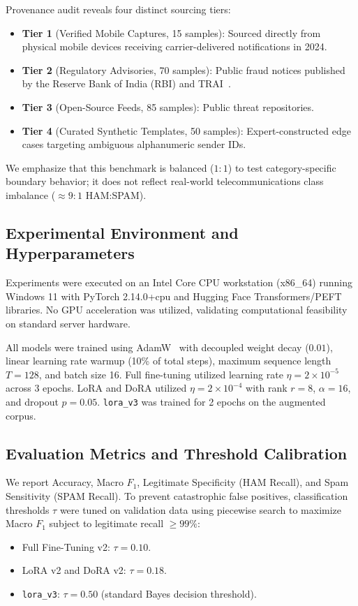 \documentclass[conference]{IEEEtran}
\begin{document}
Provenance audit reveals four distinct sourcing tiers:
\begin{itemize}
    \item \textbf{Tier 1} (Verified Mobile Captures, 15 samples): Sourced directly from physical mobile devices receiving carrier-delivered notifications in 2024.
    \item \textbf{Tier 2} (Regulatory Advisories, 70 samples): Public fraud notices published by the Reserve Bank of India (RBI) and TRAI~\cite{trai2018tcccpr}.
    \item \textbf{Tier 3} (Open-Source Feeds, 85 samples): Public threat repositories.
    \item \textbf{Tier 4} (Curated Synthetic Templates, 50 samples): Expert-constructed edge cases targeting ambiguous alphanumeric sender IDs.
\end{itemize}
We emphasize that this benchmark is balanced ($1:1$) to test category-specific boundary behavior; it does not reflect real-world telecommunications class imbalance ($\approx 9:1$ HAM:SPAM).

\subsection{Experimental Environment and Hyperparameters}
Experiments were executed on an Intel Core CPU workstation (x86\_64) running Windows 11 with PyTorch 2.14.0+cpu and Hugging Face Transformers/PEFT libraries. No GPU acceleration was utilized, validating computational feasibility on standard server hardware.

All models were trained using AdamW~\cite{loshchilov2019adamw} with decoupled weight decay ($0.01$), linear learning rate warmup (10\% of total steps), maximum sequence length $T=128$, and batch size 16. Full fine-tuning utilized learning rate $\eta = 2 \times 10^{-5}$ across 3 epochs. LoRA and DoRA utilized $\eta = 2 \times 10^{-4}$ with rank $r=8$, $\alpha=16$, and dropout $p=0.05$. \texttt{lora\_v3} was trained for 2 epochs on the augmented corpus.

\subsection{Evaluation Metrics and Threshold Calibration}
We report Accuracy, Macro $F_1$, Legitimate Specificity (HAM Recall), and Spam Sensitivity (SPAM Recall). To prevent catastrophic false positives, classification thresholds $\tau$ were tuned on validation data using piecewise search to maximize Macro $F_1$ subject to legitimate recall $\ge 99\%$:
\begin{itemize}
    \item Full Fine-Tuning v2: $\tau = 0.10$.
    \item LoRA v2 and DoRA v2: $\tau = 0.18$.
    \item \texttt{lora\_v3}: $\tau = 0.50$ (standard Bayes decision threshold).
\end{itemize}
\end{document}
